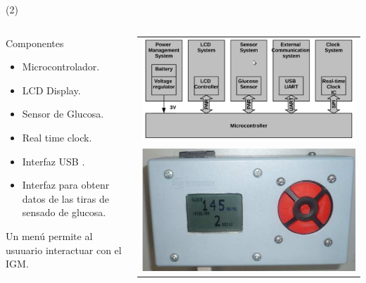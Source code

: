 \begin{frame}{ (2)}


\begin{columns}
		\begin{column}{0.48\textwidth}
		    Componentes
		    \begin{itemize}
		        \item Microcontrolador.
                \item LCD Display.
                \item Sensor de Glucosa.
                \item Real time clock.
                \item Interfaz USB .
                \item Interfaz para obtenr datos de las tiras de sensado de glucosa.
            \end{itemize}
            Un menú permite al usuuario interactuar con el IGM. 
		\end{column}
		
				\begin{column}{0.48\textwidth}
\begin{center}
     \begin{tabular}{c}
         \includegraphics[width=0.85\linewidth]{Figs/IntelligentGlucometer1}\\
         \includegraphics[width=0.75\linewidth]{Figs/IntelligentGlucometer3}\\
          \end{tabular}
\end{center}
		\end{column}
				\end{columns}

\end{frame}




